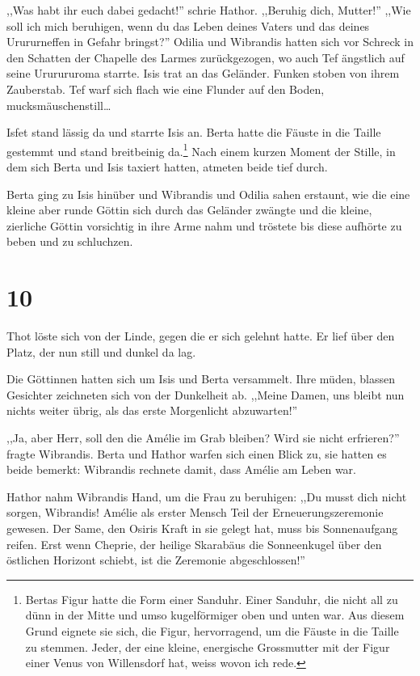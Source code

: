 \documentclass[11pt,titlepage,a5paper]{book}
\begin{document}
,,Was habt ihr euch dabei gedacht!'' schrie Hathor. ,,Beruhig dich, Mutter!'' ,,Wie soll ich mich beruhigen, wenn du das Leben deines Vaters und das deines Urururneffen in Gefahr bringst?'' Odilia und Wibrandis hatten sich vor Schreck in den Schatten der Chapelle des Larmes zurückgezogen, wo auch Tef ängstlich auf seine Ururururoma starrte. Isis trat an das Geländer. Funken stoben von ihrem Zauberstab. Tef warf sich flach wie eine Flunder auf den Boden, mucksmäuschenstill\dots

Isfet stand lässig da und starrte Isis an. Berta hatte die Fäuste in die Taille gestemmt und stand breitbeinig da.\footnote{Bertas Figur hatte die Form einer Sanduhr. Einer Sanduhr, die nicht all zu dünn in der Mitte und umso kugelförmiger oben und unten war. Aus diesem Grund eignete sie sich, die Figur, hervorragend, um die Fäuste in die Taille zu stemmen. Jeder, der eine kleine, energische Grossmutter mit der Figur einer Venus von Willensdorf hat, weiss wovon ich rede.} Nach einem kurzen Moment der Stille, in dem sich Berta und Isis taxiert hatten, atmeten beide tief durch.

Berta ging zu Isis hinüber und Wibrandis und Odilia sahen erstaunt, wie die eine kleine aber runde Göttin sich durch das Geländer zwängte und die kleine, zierliche Göttin vorsichtig in ihre Arme nahm und tröstete bis diese aufhörte zu beben und zu schluchzen.

\section*{10}

Thot löste sich von der Linde, gegen die er sich gelehnt hatte. Er lief über den Platz, der nun still und dunkel da lag.

Die Göttinnen hatten sich um Isis und Berta versammelt. Ihre müden, blassen Gesichter zeichneten sich von der Dunkelheit ab. ,,Meine Damen, uns bleibt nun nichts weiter übrig, als das erste Morgenlicht abzuwarten!'' 

,,Ja, aber Herr, soll den die Amélie im Grab bleiben? Wird sie nicht erfrieren?'' fragte Wibrandis. Berta und Hathor warfen sich einen Blick zu, sie hatten es beide bemerkt: Wibrandis rechnete damit, dass Amélie am Leben war.

Hathor nahm Wibrandis Hand, um die Frau zu beruhigen: ,,Du musst dich nicht sorgen, Wibrandis! Amélie als erster Mensch Teil der Erneuerungszeremonie gewesen. Der Same, den Osiris Kraft in sie gelegt hat, muss bis Sonnenaufgang reifen. Erst wenn Cheprie, der heilige Skarabäus die Sonneenkugel über den östlichen Horizont schiebt, ist die Zeremonie abgeschlossen!''
\end{document}

